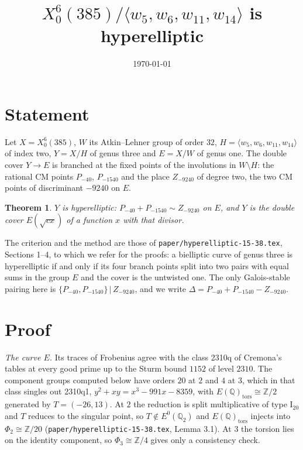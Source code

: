 \documentclass[11pt,reqno]{amsart}
\theoremstyle{plain}
\newtheorem{theorem}{Theorem}[section]
\theoremstyle{definition}
\newcommand{\Q}{\mathbb{Q}}
\newcommand{\Z}{\mathbb{Z}}
\begin{document}
\title{$X_0^{6}(385)/\langle w_5,w_6,w_{11},w_{14}\rangle$ is hyperelliptic}
\author{}
\date{\today}
\maketitle

\section{Statement}

Let $X=X_0^6(385)$, $W$ its Atkin--Lehner group of order $32$, $H=\langle w_5,w_6,w_{11},w_{14}\rangle$ of index
two, $Y=X/H$ of genus three and $E=X/W$ of genus one. The double cover $Y\to E$ is branched at the fixed points of
the involutions in $W\setminus H$: the rational CM points $P_{-40}$, $P_{-1540}$ and the place $Z_{-9240}$ of
degree two, the two CM points of discriminant $-9240$ on $E$.

\begin{theorem}\label{thm:main}
$Y$ is hyperelliptic: $P_{-40}+P_{-1540}\sim Z_{-9240}$ on $E$, and $Y$ is the double cover $E(\sqrt{cx})$ of a
function $x$ with that divisor.
\end{theorem}

The criterion and the method are those of \texttt{paper/hyperelliptic-15-38.tex}, Sections 1--4, to which we
refer for the proofs: a bielliptic curve of genus three is hyperelliptic if and only if its four branch points
split into two pairs with equal sums in the group $E$ and the cover is the untwisted one. The only Galois-stable
pairing here is $\{P_{-40},P_{-1540}\}\,|\,Z_{-9240}$, and we write $\Delta=P_{-40}+P_{-1540}-Z_{-9240}$.

\section{Proof}

\emph{The curve $E$.} Its traces of Frobenius agree with the class 2310q of Cremona's tables at every good
prime up to the Sturm bound $1152$ of level $2310$. The component groups computed below have orders $20$ at $2$
and $4$ at $3$, which in that class singles out 2310q1, $y^2+xy=x^3-991x-8359$, with
$E(\Q)_{\mathrm{tors}}\cong\Z/2$ generated by $T=(-26,13)$. At $2$ the reduction is split multiplicative of type
$\mathrm{I}_{20}$ and $T$ reduces to the singular point, so $T\notin E^0(\Q_2)$ and $E(\Q)_{\mathrm{tors}}$
injects into $\Phi_2\cong\Z/20$ (\texttt{paper/hyperelliptic-15-38.tex}, Lemma 3.1). At $3$ the torsion lies on
the identity component, so $\Phi_3\cong\Z/4$ gives only a consistency check.
\end{document}
